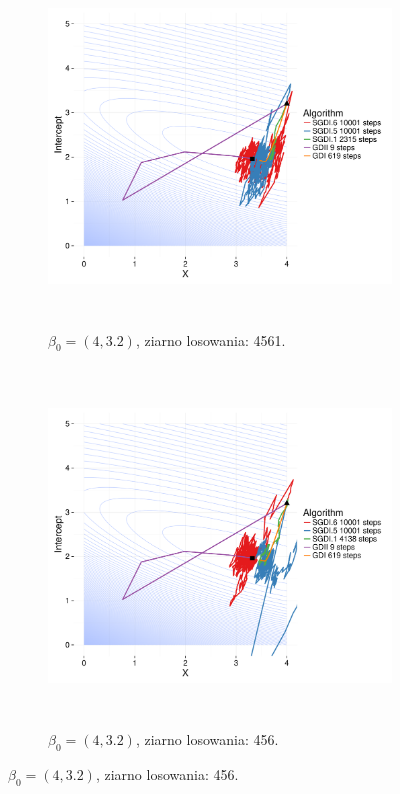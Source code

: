 \begin{figure}[hbt!]
  \begin{center}
   \begin{subfigure}[h!]{0.9\textwidth}
      \includegraphics[width=\textwidth, height=270pt]{Obrazki/Numeryka/sgd_32_4_1.pdf}
      \caption{$\beta_0 = (4,3.2)$, ziarno losowania: 4561.}
   \end{subfigure}     
   \begin{subfigure}[h!]{0.9\textwidth}
      \includegraphics[width=\textwidth, height=270pt]{Obrazki/Numeryka/sgd_32_4_2.pdf}
      \caption{$\beta_0 = (4,3.2)$, ziarno losowania: 456.}
   \end{subfigure}  \end{center}

\end{figure}
